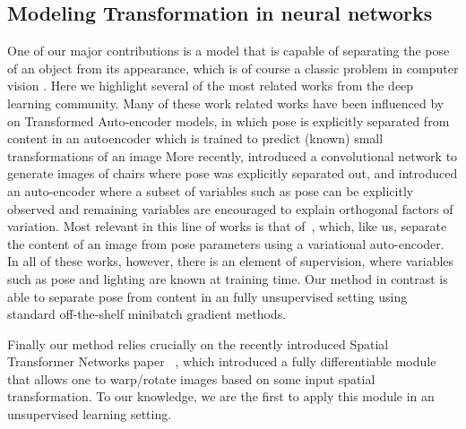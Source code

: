 \subsection{Modeling Transformation in neural networks}
One of our major contributions is a model that is capable of separating the pose of an object from its appearance,
which is of course a classic problem in computer vision . 
Here we highlight several of the most related works from 
the deep learning community.  
Many of these work related works have been influenced by \cite{hinton2011transforming} on Transformed Auto-encoder models,
in which pose is explicitly separated from content in an autoencoder which is trained to predict (known)
small transformations of an image 
More recently,  \cite{dosovitskiy2014learning} introduced a convolutional network to generate images of chairs where pose was explicitly separated out, and \cite{cheung2014discovering} introduced an auto-encoder where a subset of variables such as pose can be explicitly observed and remaining
variables are encouraged to explain orthogonal factors of variation.   
Most relevant in this line of works is that of~\cite{kulkarni2015deep}, which, like us, 
separate the content of an image from pose parameters using a variational auto-encoder.
In all of these works, however, there is an element of supervision, where variables such as pose
and lighting are known at training time. 
Our method in contrast is able to separate pose from content in an fully unsupervised setting 
using standard off-the-shelf minibatch gradient methods.




Finally our method relies crucially on the recently introduced Spatial
Transformer Networks paper
 ~\citep{jaderberg2015spatial}, which introduced 
a fully differentiable module that allows one to warp/rotate images based on some input spatial transformation.
To our knowledge, we are the first to apply this module in an unsupervised learning setting.  


